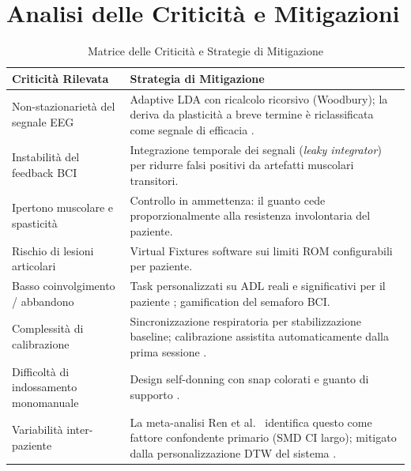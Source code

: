 \documentclass[a4paper,11pt]{article}
\begin{document}
\newpage
\section{Analisi delle Criticità e Mitigazioni}
\begin{table}[h]
\centering
\label{tab:criticita}
\begin{tabular}{@{}p{6cm}p{7.5cm}@{}}
\toprule
\textbf{Criticità Rilevata} & \textbf{Strategia di Mitigazione} \\ \midrule
Non-stazionarietà del segnale EEG
  & Adaptive LDA con ricalcolo ricorsivo (Woodbury); la deriva da plasticità a
    breve termine è riclassificata come segnale di efficacia \cite{wu2024adaptive}. \\[4pt]
Instabilità del feedback BCI
  & Integrazione temporale dei segnali (\textit{leaky integrator}) per ridurre
    falsi positivi da artefatti muscolari transitori. \\[4pt]
Ipertono muscolare e spasticità
  & Controllo in ammettenza: il guanto cede proporzionalmente alla resistenza
    involontaria del paziente. \\[4pt]
Rischio di lesioni articolari
  & Virtual Fixtures software sui limiti ROM configurabili per paziente. \\[4pt]
Basso coinvolgimento / abbandono
  & Task personalizzati su ADL reali e significativi per il paziente
    \cite{premchand2025personalized}; gamification del semaforo BCI. \\[4pt]
Complessità di calibrazione
  & Sincronizzazione respiratoria per stabilizzazione baseline; calibrazione
    assistita automaticamente dalla prima sessione \cite{premchand2025personalized}. \\[4pt]
Difficoltà di indossamento monomanuale
  & Design self-donning con snap colorati e guanto di supporto
    \cite{proietti2024combining}. \\[4pt]
Variabilità inter-paziente
  & La meta-analisi Ren et al.\ \cite{ren2024effect} identifica questo come
    fattore confondente primario (SMD CI largo); mitigato dalla personalizzazione
    DTW del sistema \cite{premchand2025personalized}. \\ \bottomrule
\end{tabular}
\caption{Matrice delle Criticità e Strategie di Mitigazione}
\end{table}

\end{document}
